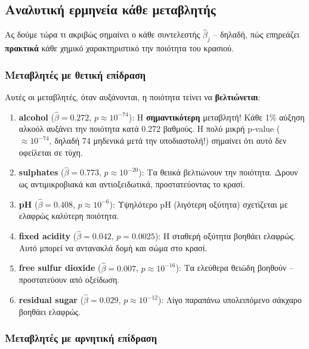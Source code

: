 \documentclass[12pt,a4paper]{article}
\begin{document}
\subsection{Αναλυτική ερμηνεία κάθε μεταβλητής}

Ας δούμε τώρα τι ακριβώς σημαίνει ο κάθε συντελεστής $\hat{\beta}_j$ -- δηλαδή, πώς επηρεάζει \textbf{πρακτικά} κάθε χημικό χαρακτηριστικό την ποιότητα του κρασιού.

\subsubsection{Μεταβλητές με θετική επίδραση}

Αυτές οι μεταβλητές, όταν αυξάνονται, η ποιότητα τείνει να \textbf{βελτιώνεται}:

\begin{enumerate}
    \item \textbf{alcohol} ($\hat{\beta} = 0.272$, $p \approx 10^{-74}$): Η \textbf{σημαντικότερη} μεταβλητή! Κάθε 1\% αύξηση αλκοόλ αυξάνει την ποιότητα κατά 0.272 βαθμούς. Η πολύ μικρή p-value ($\approx 10^{-74}$, δηλαδή 74 μηδενικά μετά την υποδιαστολή!) σημαίνει ότι αυτό δεν οφείλεται σε τύχη.

    \item \textbf{sulphates} ($\hat{\beta} = 0.773$, $p \approx 10^{-20}$): Τα θειικά βελτιώνουν την ποιότητα. Δρουν ως αντιμικροβιακά και αντιοξειδωτικά, προστατεύοντας το κρασί.

    \item \textbf{pH} ($\hat{\beta} = 0.408$, $p \approx 10^{-6}$): Υψηλότερο pH (λιγότερη οξύτητα) σχετίζεται με ελαφρώς καλύτερη ποιότητα.

    \item \textbf{fixed acidity} ($\hat{\beta} = 0.042$, $p = 0.0025$): Η σταθερή οξύτητα βοηθάει ελαφρώς. Αυτό μπορεί να αντανακλά δομή και σώμα στο κρασί.

    \item \textbf{free sulfur dioxide} ($\hat{\beta} = 0.007$, $p \approx 10^{-16}$): Τα ελεύθερα θειώδη βοηθούν -- προστατεύουν από οξείδωση.

    \item \textbf{residual sugar} ($\hat{\beta} = 0.029$, $p \approx 10^{-12}$): Λίγο παραπάνω υπολειπόμενο σάκχαρο βοηθάει ελαφρώς.
\end{enumerate}

\subsubsection{Μεταβλητές με αρνητική επίδραση}
\end{document}
